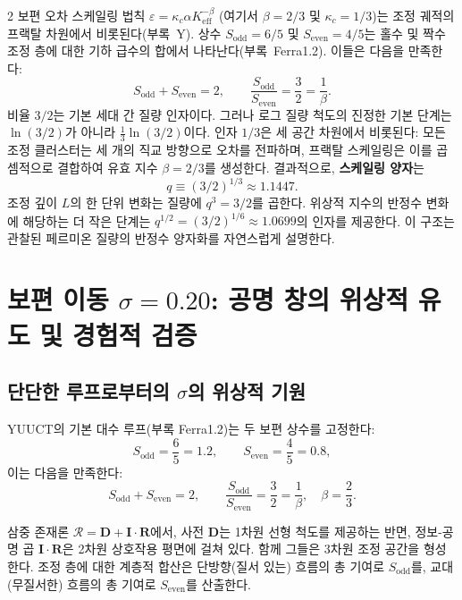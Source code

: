 \documentclass[11pt,a4paper]{article}
\newcommand{\Sodd}{S_{\mathrm{odd}}}
\newcommand{\Seven}{S_{\mathrm{even}}}
\begin{document}
\begin{multicols}{2}
		보편 오차 스케일링 법칙 \(\varepsilon = \kappa_c \alpha K_{\mathrm{eff}}^{-\beta}\) (여기서 \(\beta = 2/3\) 및 \(\kappa_c = 1/3\))는 조정 궤적의 프랙탈 차원에서 비롯된다(부록~Y). 상수 \(\Sodd = 6/5\) 및 \(\Seven = 4/5\)는 홀수 및 짝수 조정 층에 대한 기하 급수의 합에서 나타난다(부록~Ferra1.2). 이들은 다음을 만족한다:
		\[
		\Sodd + \Seven = 2, \qquad \frac{\Sodd}{\Seven} = \frac{3}{2} = \frac{1}{\beta}.
		\]
		비율 \(3/2\)는 기본 세대 간 질량 인자이다. 그러나 로그 질량 척도의 진정한 기본 단계는 \(\ln(3/2)\)가 아니라 \(\frac{1}{3}\ln(3/2)\)이다. 인자 \(1/3\)은 세 공간 차원에서 비롯된다: 모든 조정 클러스터는 세 개의 직교 방향으로 오차를 전파하며, 프랙탈 스케일링은 이를 곱셈적으로 결합하여 유효 지수 \(\beta = 2/3\)를 생성한다. 결과적으로, \textbf{스케일링 양자}는
		\begin{equation}
			q \equiv (3/2)^{1/3} \approx 1.1447.
		\end{equation}
		조정 깊이 \(L\)의 한 단위 변화는 질량에 \(q^3 = 3/2\)를 곱한다. 위상적 지수의 반정수 변화에 해당하는 더 작은 단계는 \(q^{1/2} = (3/2)^{1/6} \approx 1.0699\)의 인자를 제공한다. 이 구조는 관찰된 페르미온 질량의 반정수 양자화를 자연스럽게 설명한다.
		
		\section{보편 이동 \(\sigma = 0.20\): 공명 창의 위상적 유도 및 경험적 검증}
		\label{sec:sigma}
		
		\subsection{단단한 루프로부터의 \(\sigma\)의 위상적 기원}
		
		YUUCT의 기본 대수 루프(부록 Ferra1.2)는 두 보편 상수를 고정한다:
		\[
		S_{\mathrm{odd}} = \frac{6}{5} = 1.2,\qquad S_{\mathrm{even}} = \frac{4}{5} = 0.8,
		\]
		이는 다음을 만족한다:
		\[
		S_{\mathrm{odd}} + S_{\mathrm{even}} = 2,\qquad \frac{S_{\mathrm{odd}}}{S_{\mathrm{even}}} = \frac{3}{2} = \frac{1}{\beta},\quad \beta = \frac{2}{3}.
		\]
		
		삼중 존재론 \( \mathcal{R} = \mathbf{D} + \mathbf{I}\!\cdot\!\mathbf{R} \)에서, 사전 \(\mathbf{D}\)는 1차원 선형 척도를 제공하는 반면, 정보-공명 곱 \(\mathbf{I}\!\cdot\!\mathbf{R}\)은 2차원 상호작용 평면에 걸쳐 있다. 함께 그들은 3차원 조정 공간을 형성한다. 조정 층에 대한 계층적 합산은 단방향(질서 있는) 흐름의 총 기여로 \(S_{\mathrm{odd}}\)를, 교대(무질서한) 흐름의 총 기여로 \(S_{\mathrm{even}}\)를 산출한다.
		

\end{multicols}
\end{document}
